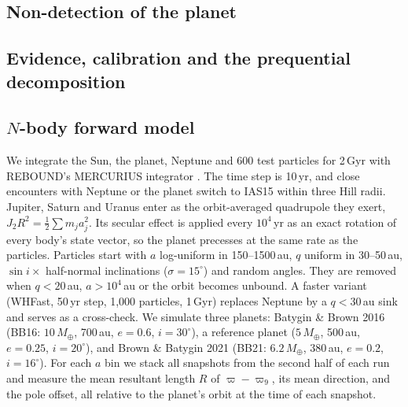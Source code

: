 \documentclass[twocolumn,linenumbers]{aastex631}
\newcommand{\Mearth}{M_\oplus}
\newcommand{\vpi}{\varpi}
\begin{document}
\subsection{Non-detection of the planet}\label{sec:nondet}

\subsection{Evidence, calibration and the prequential decomposition}\label{sec:prequential}

\subsection{$N$-body forward model}\label{sec:nbody}
We integrate the Sun, the planet, Neptune and 600 test particles for 2\,Gyr with REBOUND's MERCURIUS integrator \citep{Rein2012}. The time step is 10\,yr, and close encounters with Neptune or the planet switch to IAS15 within three Hill radii. Jupiter, Saturn and Uranus enter as the orbit-averaged quadrupole they exert, $J_2R^2=\frac12\sum m_ja_j^2$. Its secular effect is applied every $10^4$\,yr as an exact rotation of every body's state vector, so the planet precesses at the same rate as the particles. Particles start with $a$ log-uniform in 150--1500\,au, $q$ uniform in 30--50\,au, $\sin i\times$ half-normal inclinations ($\sigma=15^\circ$) and random angles. They are removed when $q<20$\,au, $a>10^4$\,au or the orbit becomes unbound. A faster variant (WHFast, 50\,yr step, 1,000 particles, 1\,Gyr) replaces Neptune by a $q<30$\,au sink and serves as a cross-check. We simulate three planets: Batygin \& Brown 2016 (BB16: $10\,\Mearth$, 700\,au, $e=0.6$, $i=30^\circ$), a reference planet ($5\,\Mearth$, 500\,au, $e=0.25$, $i=20^\circ$), and Brown \& Batygin 2021 (BB21: $6.2\,\Mearth$, 380\,au, $e=0.2$, $i=16^\circ$). For each $a$ bin we stack all snapshots from the second half of each run and measure the mean resultant length $R$ of $\vpi-\vpi_9$, its mean direction, and the pole offset, all relative to the planet's orbit at the time of each snapshot.
\end{document}

